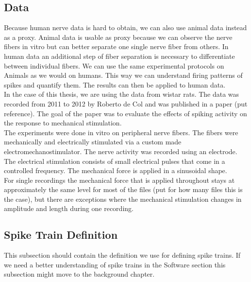 \subsection{Data}
Because human nerve data is hard to obtain, we can also use animal data instead as a proxy. Animal data is usable as proxy because we can observe the nerve fibers in vitro but can better separate one single nerve fiber from others. In human data an additional step of fiber separation is necessary to differentiate between individual fibers. We can use the same experimental protocols on Animals as we would on humans. This way we can understand firing patterns of spikes and quantify them. The results can then be applied to human data. \\
In the case of this thesis, we are using the data from wistar rats. The data was recorded from 2011 to 2012 by Roberto de Col and was published in a paper (put reference). The goal of the paper was to evaluate the effects of spiking activity on the response to mechanical stimulation. \\

The experiments were done in vitro on peripheral nerve fibers. The fibers were mechanically and electrically stimulated via a custom made electromechanostimulator. The nerve activity was recorded using an electrode. The electrical stimulation consists of small electrical pulses that come in a controlled frequency. The mechanical force is applied in a sinusoidal shape. \\
For single recordings the mechanical force that is applied throughout stays at approximately the same level for most of the files (put for how many files this is the case), but there are exceptions where the mechanical stimulation changes in amplitude and length during one recording. 

\subsection{Spike Train Definition}
This subsection should contain the definition we use for defining spike trains. If we need a better understanding of spike trains in the Software section this subsection might move to the background chapter.


